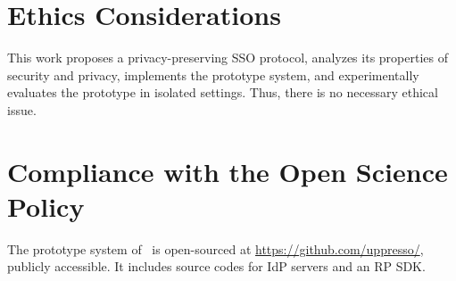 \section*{Ethics Considerations}
This work proposes a privacy-preserving SSO protocol, analyzes its properties of security and privacy,
    implements the prototype system,
    and experimentally evaluates the prototype in isolated settings.
Thus, there is no necessary ethical issue.

\section*{Compliance with the Open Science Policy}
The prototype system of \usso\ is open-sourced at \url{https://github.com/uppresso/}, publicly accessible.
It includes source codes for IdP servers and an RP SDK.